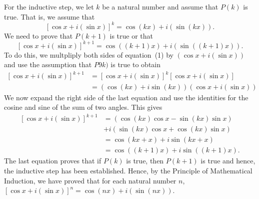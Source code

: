 \documentclass[11pt]{article}
\begin{document}
\begin{enumerate}
\newpar
For the inductive step, we let $k$ be a natural number and assume that $P(k)$ is true.  That is, we assume that 
\begin{equation}
\left[ {\cos x + i(\sin x)} \right]^k  = \cos (kx) + i\left( {\sin (kx)} \right).
\end{equation}
We need to prove that $P(k+1)$ is true or that
\begin{equation}
\left[ {\cos x + i(\sin x)} \right]^{k+1}  = \cos ((k + 1)x) + i\left( {\sin ((k + 1)x)} \right).
\end{equation}
To do this, we multpliply both sides of equation~(1) by $\left( \cos x + i(\sin x) \right)$ and use the assumption that $P9k)$ is true to obtain
\begin{align*}
\left[ {\cos x + i(\sin x)} \right]^{k+1} &= \left[ {\cos x + i(\sin x)} \right]^k \left[ {\cos x + i \left(\sin x \right)} \right] \\
  &= \left( \cos (kx) + i {\sin (kx)} \right) \left( \cos x + i \left(\sin x \right) \right)
\end{align*}
We now expand the right side of the last equation and use the identities for the cosine and sine of the sum of two angles.  This gives
\begin{align*}
  \left[ {\cos x + i(\sin x)} \right]^{k+1}&= \left( \cos \left( kx \right) \cos x - \sin \left( kx \right) \sin x \right) \\
  &+ i \left( \sin \left( kx \right) \cos x + \cos \left( kx \right) \sin x \right)\\
  &= \cos \left(kx + x \right) + i \sin \left( kx + x \right) \\
  &= \cos \left( \left( k + 1 \right ) x \right) + i \sin \left( \left( k + 1 \right ) x \right).
\end{align*}
The last equation proves that if $P(k)$ is true, then $P(k + 1)$ is true and hence, the inductive step has been established.  Hence, by the Principle of Mathematical Induction, we have proved that for each natural number $n$, 
$\left[ {\cos x + i(\sin x)} \right]^n  = \cos (nx) + i\left( {\sin (nx)} \right)$.


\end{enumerate}
\end{document}
